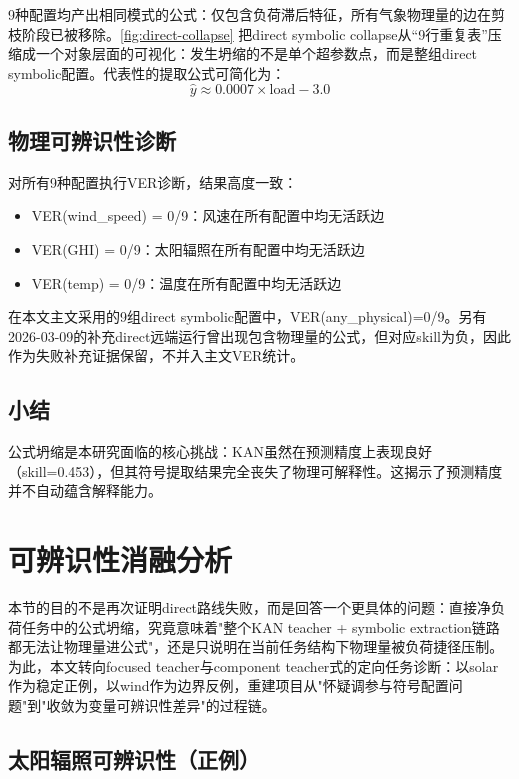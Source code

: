 9种配置均产出相同模式的公式：仅包含负荷滞后特征，所有气象物理量的边在剪枝阶段已被移除。\cref{fig:direct-collapse} 把direct symbolic collapse从“9行重复表”压缩成一个对象层面的可视化：发生坍缩的不是单个超参数点，而是整组direct symbolic配置。代表性的提取公式可简化为：
\begin{equation}
\hat{y} \approx 0.0007 \times \text{load} - 3.0
\end{equation}

\subsection{物理可辨识性诊断}

对所有9种配置执行VER诊断，结果高度一致：
\begin{itemize}
  \item VER(wind\_speed) = 0/9：风速在所有配置中均无活跃边
  \item VER(GHI) = 0/9：太阳辐照在所有配置中均无活跃边
  \item VER(temp) = 0/9：温度在所有配置中均无活跃边
\end{itemize}

在本文主文采用的9组direct symbolic配置中，VER(any\_physical)=0/9。另有2026-03-09的补充direct远端运行曾出现包含物理量的公式，但对应skill为负，因此作为失败补充证据保留，不并入主文VER统计。

\subsection{小结}

公式坍缩是本研究面临的核心挑战：KAN虽然在预测精度上表现良好（skill=0.453），但其符号提取结果完全丧失了物理可解释性。这揭示了预测精度并不自动蕴含解释能力。

\section{可辨识性消融分析}

本节的目的不是再次证明direct路线失败，而是回答一个更具体的问题：直接净负荷任务中的公式坍缩，究竟意味着"整个KAN teacher + symbolic extraction链路都无法让物理量进公式"，还是只说明在当前任务结构下物理量被负荷捷径压制。为此，本文转向focused teacher与component teacher式的定向任务诊断：以solar作为稳定正例，以wind作为边界反例，重建项目从"怀疑调参与符号配置问题"到"收敛为变量可辨识性差异"的过程链。

\subsection{太阳辐照可辨识性（正例）}

